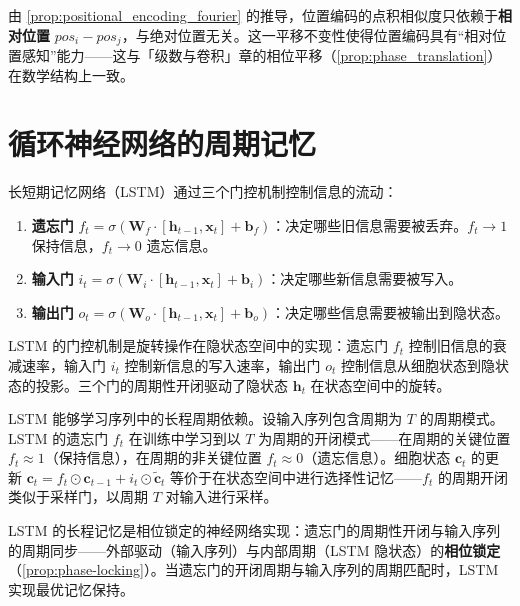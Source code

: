 \begin{remark}[位置编码点积的平移不变性]\label{rem:positional_encoding_translation_invariance}
由 \cref{prop:positional_encoding_fourier} 的推导，位置编码的点积相似度只依赖于\textbf{相对位置} $pos_i - pos_j$，与绝对位置无关。这一平移不变性使得位置编码具有“相对位置感知”能力——这与「级数与卷积」章的相位平移（\cref{prop:phase_translation}）在数学结构上一致。
\end{remark}

\section{循环神经网络的周期记忆}

\begin{definition}\label{def:lstm_gates}
长短期记忆网络（LSTM）通过三个门控机制控制信息的流动：
\begin{enumerate}[label=(\roman*)]
    \item \textbf{遗忘门} $f_t = \sigma(\mathbf{W}_f \cdot [\mathbf{h}_{t-1}, \mathbf{x}_t] + \mathbf{b}_f)$：决定哪些旧信息需要被丢弃。$f_t \to 1$ 保持信息，$f_t \to 0$ 遗忘信息。
    \item \textbf{输入门} $i_t = \sigma(\mathbf{W}_i \cdot [\mathbf{h}_{t-1}, \mathbf{x}_t] + \mathbf{b}_i)$：决定哪些新信息需要被写入。
    \item \textbf{输出门} $o_t = \sigma(\mathbf{W}_o \cdot [\mathbf{h}_{t-1}, \mathbf{x}_t] + \mathbf{b}_o)$：决定哪些信息需要被输出到隐状态。
\end{enumerate}
LSTM 的门控机制是旋转操作在隐状态空间中的实现：遗忘门 $f_t$ 控制旧信息的衰减速率，输入门 $i_t$ 控制新信息的写入速率，输出门 $o_t$ 控制信息从细胞状态到隐状态的投影。三个门的周期性开闭驱动了隐状态 $\mathbf{h}_t$ 在状态空间中的旋转。
\end{definition}

\begin{proposition}\label{prop:lstm_long_range}
LSTM 能够学习序列中的长程周期依赖。设输入序列包含周期为 $T$ 的周期模式。LSTM 的遗忘门 $f_t$ 在训练中学习到以 $T$ 为周期的开闭模式——在周期的关键位置 $f_t \approx 1$（保持信息），在周期的非关键位置 $f_t \approx 0$（遗忘信息）。细胞状态 $\mathbf{c}_t$ 的更新 $\mathbf{c}_t = f_t \odot \mathbf{c}_{t-1} + i_t \odot \tilde{\mathbf{c}}_t$ 等价于在状态空间中进行选择性记忆——$f_t$ 的周期开闭类似于采样门，以周期 $T$ 对输入进行采样。

LSTM 的长程记忆是相位锁定的神经网络实现：遗忘门的周期性开闭与输入序列的周期同步——外部驱动（输入序列）与内部周期（LSTM 隐状态）的\textbf{相位锁定}（\cref{prop:phase-locking}）。当遗忘门的开闭周期与输入序列的周期匹配时，LSTM 实现最优记忆保持。
\end{proposition}

